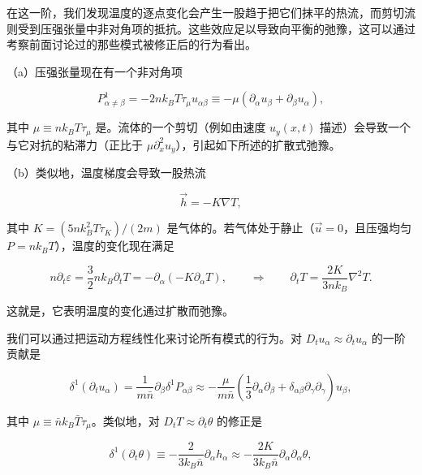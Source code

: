 在这一阶，我们发现温度的逐点变化会产生一股趋于把它们抹平的热流，而剪切流则受到压强张量中非对角项的抵抗。这些效应足以导致向平衡的弛豫，这可以通过考察前面讨论过的那些模式被修正后的行为看出。

（a）压强张量现在有一个非对角项

\begin{equation}\label{eq:3.120}
  P_{\alpha\ne\beta}^1=-2nk_BT\tau_\mu u_{\alpha\beta}\equiv-\mu\left(\partial_\alpha u_\beta+\partial_\beta u_\alpha\right),
\end{equation}

其中 $\mu\equiv nk_BT\tau_\mu$ 是。流体的一个剪切（例如由速度 $u_y(x,t)$ 描述）会导致一个与它对抗的粘滞力（正比于 $\mu\partial_x^2u_y$），引起如下所述的扩散式弛豫。

（b）类似地，温度梯度会导致一股热流

\begin{equation}\label{eq:3.121}
  \vec h=-K\nabla T,
\end{equation}

其中 $K=(5nk_B^2T\tau_K)/(2m)$ 是气体的。若气体处于静止（$\vec u=0$，且压强均匀 $P=nk_BT$），温度的变化现在满足

\begin{equation}\label{eq:3.122}
  n\partial_t\varepsilon=\frac{3}{2}nk_B\partial_tT=-\partial_\alpha\left(-K\partial_\alpha T\right),\qquad\Longrightarrow\qquad\partial_tT=\frac{2K}{3nk_B}\nabla^2T.
\end{equation}

这就是，它表明温度的变化通过扩散而弛豫。

我们可以通过把运动方程线性化来讨论所有模式的行为。对 $D_tu_\alpha\approx\partial_tu_\alpha$ 的一阶贡献是

\begin{equation}\label{eq:3.123}
  \delta^1\left(\partial_tu_\alpha\right)=\frac{1}{m\bar n}\partial_\beta\delta^1P_{\alpha\beta}\approx-\frac{\mu}{m\bar n}\left(\frac{1}{3}\partial_\alpha\partial_\beta+\delta_{\alpha\beta}\partial_\gamma\partial_\gamma\right)u_\beta,
\end{equation}

其中 $\mu\equiv\bar nk_B\bar T\tau_\mu$。类似地，对 $D_tT\approx\partial_t\theta$ 的修正是

\begin{equation}\label{eq:3.124}
  \delta^1\left(\partial_t\theta\right)\equiv-\frac{2}{3k_B\bar n}\partial_\alpha h_\alpha\approx-\frac{2K}{3k_B\bar n}\partial_\alpha\partial_\alpha\theta,
\end{equation}

